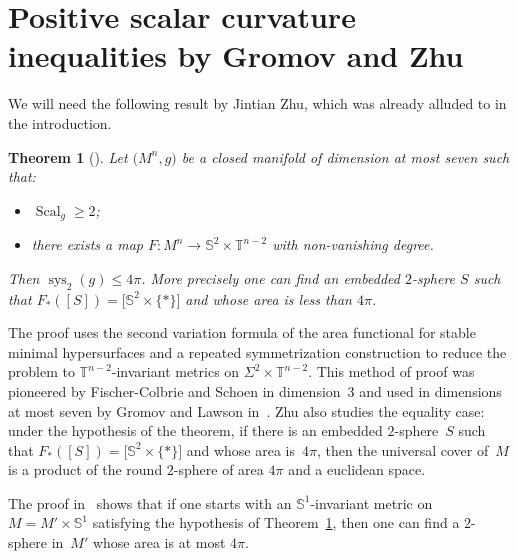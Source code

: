 \documentclass[10pt,a4paper]{amsart}
\numberwithin{equation}{section}
\newtheorem{thm}{Theorem}[section]
\DeclareMathOperator{\scal}{Scal}
\DeclareMathOperator{\sys}{sys}
\begin{document}
\section{Positive scalar curvature inequalities by Gromov and Zhu}\label{sec:results-gromov-zhu}

We will need the following result by Jintian Zhu, which was already
alluded to in the introduction.

\begin{thm}[{\cite[Theorem 1.2]{zhu2020rigidity}}]\label{thm-zhu}
 Let $\big(M^n,g\big)$ be a closed manifold of dimension at most seven such
 that:
 \begin{itemize}\itemsep=0pt
 \item $\scal_g\geq 2$;
 \item there exists a map $F\colon M^n\to\mathbb{S}^2\times\mathbb{T}^{n-2}$
 with non-vanishing degree.
 \end{itemize}
 Then $\sys_2(g)\leq 4\pi$. More precisely one can find an
 embedded $2$-sphere $S$ such that
 $F_*([S])=\big[\mathbb{S}^2\times\{\ast\}\big]$ and whose area is less than $4\pi$.
\end{thm}
The proof uses the second variation formula of the area functional for stable minimal hypersurfaces and a
repeated symmetrization construction to reduce the problem to
$\mathbb{T}^{n-2}$-invariant metrics on
$\Sigma^2\times\mathbb{T}^{n-2}$. This method of proof was pioneered
by Fischer-Colbrie and Schoen in dimension~3 and used in
dimensions at most seven by Gromov and Lawson in~\cite{gromov1983positive}. Zhu also \mbox{studies} the equality case: under
the hypothesis of the theorem, if there is an embedded $2$-sphere~$S$
such that $F_* ([S]) = \big[\mathbb{S}^2 \times \{*\}\big]$ and whose area is~$4\pi$, then the universal cover of~$M$ is a product of the round $2$-sphere of area $4\pi$ and a euclidean space.

\begin{rem}\label{rem-zhu}
 The proof in~\cite{zhu2020rigidity} shows that if one starts with an
 $\mathbb{S}^1$-invariant metric on $M=M'\times\mathbb{S}^1$
 satisfying the hypothesis of Theorem~\ref{thm-zhu}, then one can
 find a $2$-sphere in~$M'$ whose area is at most $4\pi$.
\end{rem}
\end{document}
